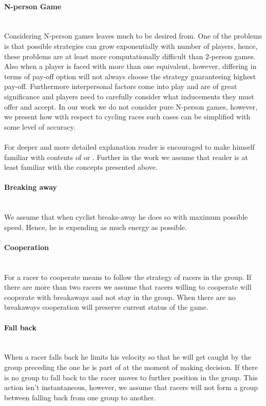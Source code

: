\documentclass[10pt, a4paper]{report}
\begin{document}
\paragraph{N-person Game} ~\\
Considering N-person games leaves much to be desired from. One of the problems is that possible strategies can grow exponentially with number of players, hence, these problems are at least more computationally difficult than 2-person games. Also when a player is faced with more than one equivalent, however, differing in terms of pay-off option will not always choose the strategy guaranteeing highest pay-off. Furthermore interpersonal factors come into play and are of great significance and players need to carefully consider what inducements they must offer and accept. In our work we do not consider pure N-person games, however, we present how with respect to cycling races such cases can be simplified with some level of accuracy.
\\\\
For deeper and more detailed explanation reader is encouraged to make himself familiar with contents of \cite{GameTheoryNonTechnical} or \cite{GameTheoryApplications}. Further in the work we assume that reader is at least familiar with the concepts presented above.

\paragraph{Breaking away} ~\\
We assume that when cyclist breaks-away he does so with maximum possible speed. Hence, he is expending as much energy as possible.

\paragraph{Cooperation} ~\\
For a racer to cooperate means to follow the strategy of racers in the group. If there are more than two racers we assume that racers willing to cooperate will cooperate with breakaways and not stay in the group. When there are no breakaways cooperation will preserve current status of the game.

\paragraph{Fall back} ~\\
When a racer falls back he limits his velocity so that he will get caught by the group preceding the one he is part of at the moment of making decision. If there is no group to fall back to the racer moves to further position in the group. This action isn't instantaneous, however, we assume that racers will not form a group between falling back from one group to another.
\end{document}
